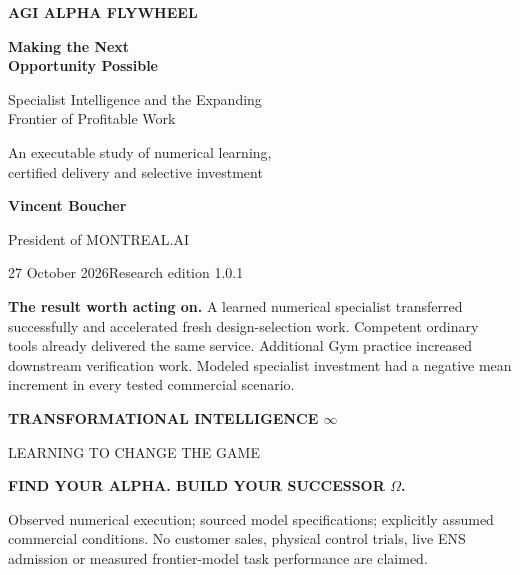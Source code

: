 \documentclass[11pt,letterpaper]{article}
\begin{document}
\begin{titlepage}
\vspace*{0.45in}
{\large\bfseries\color{teal}AGI ALPHA FLYWHEEL\par}
\vspace{0.3in}
{\Huge\bfseries\color{navy}Making the Next\\[7pt]Opportunity Possible\par}
\vspace{0.25in}
{\Large Specialist Intelligence and the Expanding\\Frontier of Profitable Work\par}
\vspace{0.25in}
{\large An executable study of numerical learning,\\certified delivery and selective investment\par}
\vspace{0.5in}
{\Large\bfseries Vincent Boucher\par}
{\large President of MONTREAL.AI\par}
\vspace{0.32in}
{\color{muted}27 October 2026\quad\textbullet\quad Research edition 1.0.1\par}
\vfill
\colorbox{pale}{\parbox{0.94\linewidth}{\vspace{10pt}\textbf{The result worth acting on.} A learned numerical specialist transferred successfully and accelerated fresh design-selection work. Competent ordinary tools already delivered the same service. Additional Gym practice increased downstream verification work. Modeled specialist investment had a negative mean increment in every tested commercial scenario.\vspace{10pt}}}\par
\vspace{0.35in}
{\bfseries\color{navy}TRANSFORMATIONAL INTELLIGENCE $\infty$\par}
{\color{muted}LEARNING TO CHANGE THE GAME\par}
\vspace{0.13in}
{\bfseries FIND YOUR ALPHA. BUILD YOUR SUCCESSOR $\Omega$.\par}
\vspace{0.3in}
{\small\color{muted}Observed numerical execution; sourced model specifications; explicitly assumed commercial conditions. No customer sales, physical control trials, live ENS admission or measured frontier-model task performance are claimed.}
\end{titlepage}
\end{document}
